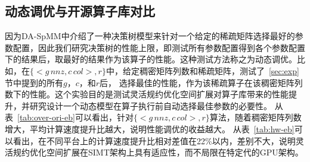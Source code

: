 \subsection{动态调优与开源算子库对比}\label{sec:overori}
因为DA-SpMM中介绍了一种决策树模型来针对一个给定的稀疏矩阵选择最好的参数配置，因此我们研究决策树的性能上限，即测试所有参数配置得到各个参数配置下的结果后，取最好的结果作为该算子的性能。这种测试方法称之为动态调优。比如，在$\{<g\,nnz , c\,col>,r\}$中，给定稠密矩阵列数和稀疏矩阵，测试了~\ref{sec:exp}节中提到的所有$g$，$c$，和$r$后，
选择最佳的性能，作为该稀疏算子在该稠密矩阵列数下的性能。这个实验目的是测试灵活规约优化空间扩展对算子库带来的性能提升，并研究设计一个动态模型在算子执行前自动选择最佳参数的必要性。
从表~\ref{tab:over-ori-eb}可以看出，针对$\{<g\,nnz , c\,col>,r\}$算法，随着稠密矩阵列数增大，平均计算速度提升比越大，说明性能调优的收益越大。
从表~\ref{tab:hw-eb}可以看出，在不同平台上的计算速度提升比相对差值在22\%以内，差别不大，说明灵活规约优化空间扩展在SIMT架构上具有适应性，而不局限在特定代的GPU架构。

